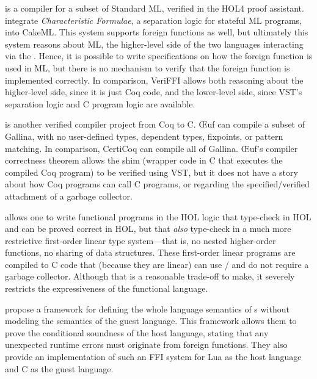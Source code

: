  is a compiler for a subset of Standard ML, verified in the HOL4 proof assistant.
 integrate \emph{Characteristic Formulae}, a separation logic for stateful ML programs, into CakeML. This system supports \gls{foreign function}s as well, but ultimately this system reasons about ML, the higher-level side of the two languages interacting via the \FFI{}.
Hence, it is possible to write specifications on how the \gls{foreign function} is used in ML, but there is no mechanism to verify that the \gls{foreign function} is implemented correctly.
In comparison, VeriFFI allows both reasoning about the higher-level side, since it is just Coq code, and the lower-level side, since VST's separation logic and C program logic are available.


 is another verified compiler project from Coq to C. 
Œuf can compile a subset of \gls{Gallina}, with no user-defined types, dependent types, fixpoints, or pattern matching.
In comparison, CertiCoq can compile all of \gls{Gallina}.
Œuf's compiler correctness theorem allows the shim (wrapper code in C that executes the compiled Coq program) to be verified using VST, but it does not have a story about how Coq programs can call C programs,
or regarding the specified/verified attachment
of a garbage collector.

 allows one to write functional programs in the HOL logic that type-check in HOL and can be proved correct in HOL, but that \emph{also} type-check in a much more restrictive first-order linear type system---that is, no nested higher-order functions, no sharing of data structures. These first-order linear programs are compiled to C code that (because they are linear) can use / and do not require a garbage collector. Although that is a reasonable trade-off to make, it severely restricts the expressiveness of the functional language.

 propose a framework for defining the whole language semantics of \FFI{}s without modeling the semantics of the guest language. This framework allows them to prove the conditional soundness of the host language, stating that any unexpected runtime errors must originate from \gls{foreign function}s. They also provide an implementation of such an FFI system for Lua as the host language and C as the guest language.

